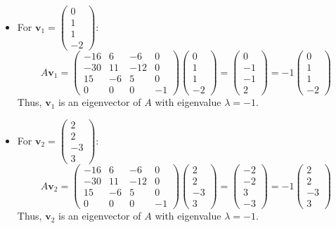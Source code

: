 \documentclass{article}
\begin{document}
\begin{itemize}
    \item For \( \mathbf{v}_1 = \begin{pmatrix} 0 \\ 1 \\ 1 \\ -2 \end{pmatrix} \):
          \[
              A \mathbf{v}_1 = \begin{pmatrix} -16 & 6 & -6 & 0 \\ -30 & 11 & -12 & 0 \\ 15 & -6 & 5 & 0 \\ 0 & 0 & 0 & -1 \end{pmatrix} \begin{pmatrix} 0 \\ 1 \\ 1 \\ -2 \end{pmatrix} = \begin{pmatrix} 0 \\ -1 \\ -1 \\ 2 \end{pmatrix} = -1 \begin{pmatrix} 0 \\ 1 \\ 1 \\ -2 \end{pmatrix}
          \]
          Thus, \( \mathbf{v}_1 \) is an eigenvector of \( A \) with eigenvalue \( \lambda = -1 \).

    \item For \( \mathbf{v}_2 = \begin{pmatrix} 2 \\ 2 \\ -3 \\ 3 \end{pmatrix} \):
          \[
              A \mathbf{v}_2 = \begin{pmatrix} -16 & 6 & -6 & 0 \\ -30 & 11 & -12 & 0 \\ 15 & -6 & 5 & 0 \\ 0 & 0 & 0 & -1 \end{pmatrix} \begin{pmatrix} 2 \\ 2 \\ -3 \\ 3 \end{pmatrix} = \begin{pmatrix} -2 \\ -2 \\ 3 \\ -3 \end{pmatrix} = -1 \begin{pmatrix} 2 \\ 2 \\ -3 \\ 3 \end{pmatrix}
          \]
          Thus, \( \mathbf{v}_2 \) is an eigenvector of \( A \) with eigenvalue \( \lambda = -1 \).


\end{itemize}
\end{document}
